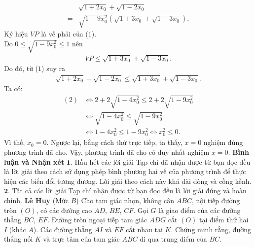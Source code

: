 \begin{multicols}{2}
\begin{align*}
		&\sqrt {1 + 2{x_0}}  + \sqrt {1 - 2{x_0}}  \\
		= &\sqrt {\!1 \!-\! 9x_0^2} \left(\!\sqrt {1 \!+\! 3{x_0}}  \!+\! \sqrt {1 \!-\! 3{x_0}}  \right). \tag{$1$}
	\end{align*}
	Ký hiệu $VP$ là vế phải của ($1$).\\
	Do $0 \le \sqrt {1 - 9x_0^2}  \le 1$  nên
	\begin{align*}
		VP \le \sqrt {1 + 3{x_0}}  + \sqrt {1 - 3{x_0}} .
	\end{align*}
	Do đó, từ ($1$) suy ra
	\begin{align*}
		\sqrt {\!1 \!+\! 2{x_0}}  \!+\!\! \sqrt {\!1 \!-\! 2{x_0}}  \!\le\!\! \sqrt {\!1 \!+\! 3{x_0}}  \!+\!\! \sqrt {\!1 \!-\! 3{x_0}} .
	\end{align*}
	Ta có:
	\begin{align*}
		(2) &\Leftrightarrow 2 + 2\sqrt {1 - 4x_0^2}  \le 2 + 2\sqrt {1 - 9x_0^2} \\
		&\Leftrightarrow \sqrt {1 - 4x_0^2}  \le \sqrt {1 - 9x_0^2} \\
		&\Leftrightarrow 1 - 4x_0^2 \le 1 - 9x_0^2 \Leftrightarrow x_0^2 \le 0.
	\end{align*}  
	Vì thế,  $x_0 = 0$.
	\vskip 0.05cm
	Ngược lại, bằng cách thử trực tiếp, ta thấy, $x = 0$ nghiệm đúng phương trình đã cho.
	\vskip 0.05cm
	Vậy, phương trình đã cho có duy nhất nghiệm $x = 0$.
	\vskip 0.05cm
	\textbf{\color{thachthuctoanhoc}Bình luận và Nhận xét}
	\vskip 0.05cm
	$\pmb{1.}$ Hầu hết các lời giải Tạp chí đã nhận được từ bạn đọc đều là lời giải theo cách sử dụng phép bình phương hai vế của phương trình để thực hiện các biến đổi tương đương. Lời giải theo cách này khá dài dòng và cồng kềnh.
	\vskip 0.05cm
	$\pmb{2.}$ Tất cả các lời giải Tạp chí nhận được từ bạn đọc đều là lời giải đúng và hoàn chỉnh.
	\vskip 0.05cm
	\hfill	\textbf{\color{thachthuctoanhoc}Lê Huy}
	\vskip 0.05cm
	{}
	(Mức $B$) Cho tam giác nhọn, không cân $ABC$, nội tiếp đường tròn $(O)$, có các đường cao $AD$, $BE$, $CF$. Gọi $G$ là giao điểm của các đường thẳng $BC$, $EF$. Đường tròn ngoại tiếp tam giác $ADG$ cắt $(O)$ tại điểm thứ hai $I$ (khác $A$). Các đường thẳng $AI$ và $EF$ cắt nhau tại $K$. Chứng minh rằng, đường thẳng nối $K$ và trực tâm của tam giác $ABC$ đi qua trung điểm của $BC$.
	\begin{figure}[H]
		\vspace*{-5pt}
		\centering
		\captionsetup{labelformat= empty, justification=centering}

\end{figure}
\end{multicols}
